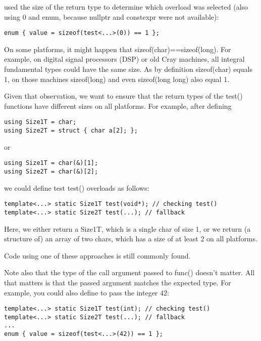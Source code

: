 used the size of the return type to determine which overload was selected (also using 0 and enum, because nullptr and constexpr were not available):

\begin{lstlisting}[style=styleCXX]
enum { value = sizeof(test<...>(0)) == 1 };
\end{lstlisting}

On some platforms, it might happen that sizeof(char)==sizeof(long). For example, on digital signal processors (DSP) or old Cray machines, all integral fundamental types could have the same size. As by definition sizeof(char) equals 1, on those machines sizeof(long) and even sizeof(long long) also equal 1.

Given that observation, we want to ensure that the return types of the test() functions have different sizes on all platforms. For example, after defining

\begin{lstlisting}[style=styleCXX]
using Size1T = char;
using Size2T = struct { char a[2]; };
\end{lstlisting}

or

\begin{lstlisting}[style=styleCXX]
using Size1T = char(&)[1];
using Size2T = char(&)[2];
\end{lstlisting}

we could define test test() overloads as follows:

\begin{lstlisting}[style=styleCXX]
template<...> static Size1T test(void*); // checking test()
template<...> static Size2T test(...); // fallback
\end{lstlisting}

Here, we either return a Size1T, which is a single char of size 1, or we return (a structure of) an array of two chars, which has a size of at least 2 on all platforms.

Code using one of these approaches is still commonly found.

Note also that the type of the call argument passed to func() doesn’t matter. All that matters is that the passed argument matches the expected type. For example, you could also define to pass the integer 42:

\begin{lstlisting}[style=styleCXX]
template<...> static Size1T test(int); // checking test()
template<...> static Size2T test(...); // fallback
...
enum { value = sizeof(test<...>(42)) == 1 };
\end{lstlisting}

